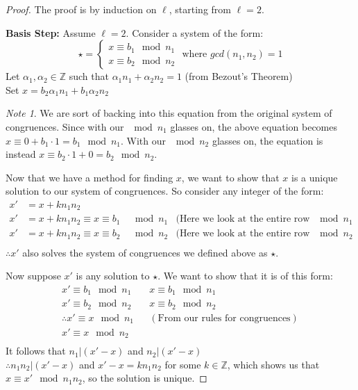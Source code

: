 \documentclass[10pt]{article}
\newcommand{\Z}{\mathbb{Z}}
\theoremstyle{definition}
\theoremstyle{remark}
\newtheorem{note}[theorem]{Note}
\def\Z{\mathbb{ Z}}
\begin{document}
\begin{proof}\label{CRT}
The proof is by induction on $\ell$, starting from $\ell = 2$.

\textbf{Basis Step:} Assume  $\ell = 2$.  Consider a system of the form:
$$\star = 
\begin{cases}
x \equiv b_1 \mod n_1\\
x \equiv b_2 \mod n_2
\end{cases}
\text{ where }gcd(n_1,n_2) = 1
$$
Let $\alpha_1, \alpha_2 \in \Z$ such that $\alpha_1 n_1 + \alpha_2 n_2 = 1$  (from Bezout's Theorem)\\
Set $x = b_2 \alpha_1 n_1 + b_1 \alpha_2 n_2$\\
\begin{note}We are sort of backing into this equation from the original system of congruences.  Since with our $\mod n_1$ glasses on, the above equation becomes $x \equiv 0 + b_1 \cdot 1 = b_1 \mod n_1$.  With our $\mod n_2$ glasses on, the equation is instead $x \equiv b_2 \cdot 1 + 0 = b_2 \mod n_2$.
\end{note}

Now that we have a method for finding $x$, we want to show that $x$ is a unique solution to our system of congruences.  So consider any integer of the form:
\begin{align*}
x' &= x + kn_1n_2\\
x' &= x + kn_1n_2 \equiv x \equiv b_1 & \mod n_1 & (\text{Here we look at the entire row $\mod n_1$}\\
x' &= x + kn_1n_2 \equiv x \equiv b_2 & \mod n_2 & (\text{Here we look at the entire row $\mod n_2$}\\
\end{align*}
$\therefore x'$ also solves the system of congruences we defined above as $\star$.

Now suppose $x'$ is any solution to $\star$.  We want to show that it is of this form:
\begin{align*}
x'\equiv b_1\mod n_1 & & x\equiv b_1\mod n_1\\
x'\equiv b_2\mod n_2 & & x\equiv b_2\mod n_2\\
\therefore x' \equiv x \mod n_1 & &(\text{From our rules for congruences})\\
x' \equiv x \mod n_2\\
\end{align*}
It follows that $n_1|(x'-x)$ and $n_2|(x'-x)$\\
$\therefore n_1n_2|(x'-x)$ and $x'-x = kn_1n_2$ for some $k \in \Z$, which shows us that $x \equiv x' \mod n_1n_2$, so the solution is unique.


\end{proof}
\end{document}
